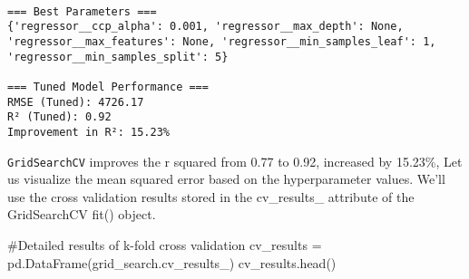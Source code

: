 \documentclass[
  letterpaper,
  DIV=11,
  numbers=noendperiod]{scrreprt}
\newenvironment{Shaded}{\begin{snugshade}}{\end{snugshade}}
\newcommand{\CommentTok}[1]{\textcolor[rgb]{0.37,0.37,0.37}{#1}}
\newcommand{\NormalTok}[1]{\textcolor[rgb]{0.00,0.23,0.31}{#1}}
\newcommand{\OperatorTok}[1]{\textcolor[rgb]{0.37,0.37,0.37}{#1}}
\begin{document}
\begin{verbatim}

=== Best Parameters ===
{'regressor__ccp_alpha': 0.001, 'regressor__max_depth': None, 'regressor__max_features': None, 'regressor__min_samples_leaf': 1, 'regressor__min_samples_split': 5}

=== Tuned Model Performance ===
RMSE (Tuned): 4726.17
R² (Tuned): 0.92
Improvement in R²: 15.23%
\end{verbatim}

\texttt{GridSearchCV} improves the r squared from 0.77 to 0.92,
increased by 15.23\%, Let us visualize the mean squared error based on
the hyperparameter values. We'll use the cross validation results stored
in the cv\_results\_ attribute of the GridSearchCV fit() object.

\begin{Shaded}
\begin{Highlighting}[]
\CommentTok{\#Detailed results of k{-}fold cross validation}
\NormalTok{cv\_results }\OperatorTok{=}\NormalTok{ pd.DataFrame(grid\_search.cv\_results\_)}
\NormalTok{cv\_results.head()}
\end{Highlighting}
\end{Shaded}
\end{document}

